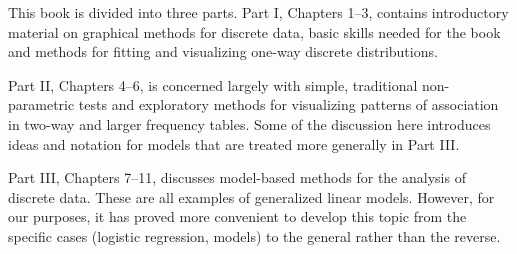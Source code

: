 
This book is divided into three parts. Part I, Chapters 1--3, contains 
introductory material on graphical methods for discrete data, 
basic \R skills needed for the book and methods for fitting
and visualizing one-way discrete distributions.

Part II, Chapters 4--6, is concerned largely with 
simple, traditional non-parametric tests and exploratory methods for
visualizing patterns of association in two-way and larger frequency tables.
Some of the discussion here introduces ideas and notation for \loglin
models that are treated more generally in Part III.

Part III, Chapters 7--11, discusses model-based methods for the
analysis of discrete data.  These are all examples of generalized
linear models.  However, for our purposes, it has proved more convenient
to develop this topic from the specific cases (logistic regression, \loglin models)
to the general rather than the reverse.

